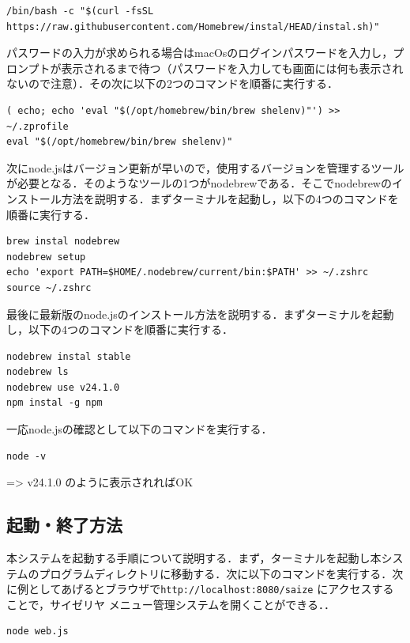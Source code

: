 \documentclass[uplatex,dvipdfmx]{jsarticle}
\begin{document}
\begin{lstlisting}
/bin/bash -c "$(curl -fsSL https://raw.githubusercontent.com/Homebrew/instal/HEAD/instal.sh)"
\end{lstlisting}

パスワードの入力が求められる場合はmacOsのログインパスワードを入力し，プロンプトが表示されるまで待つ（パスワードを入力しても画面には何も表示されないので注意）．その次に以下の2つのコマンドを順番に実行する．

\begin{lstlisting}
( echo; echo 'eval "$(/opt/homebrew/bin/brew shelenv)"') >> ~/.zprofile
eval "$(/opt/homebrew/bin/brew shelenv)"
\end{lstlisting}

次にnode.jsはバージョン更新が早いので，使用するバージョンを管理するツールが必要となる．そのようなツールの1つがnodebrewである．そこでnodebrewのインストール方法を説明する．まずターミナルを起動し，以下の4つのコマンドを順番に実行する．

\begin{lstlisting}
brew instal nodebrew
nodebrew setup
echo 'export PATH=$HOME/.nodebrew/current/bin:$PATH' >> ~/.zshrc
source ~/.zshrc
\end{lstlisting}

最後に最新版のnode.jsのインストール方法を説明する．まずターミナルを起動し，以下の4つのコマンドを順番に実行する．

\begin{lstlisting}
nodebrew instal stable
nodebrew ls
nodebrew use v24.1.0
npm instal -g npm
\end{lstlisting}

一応node.jsの確認として以下のコマンドを実行する．

\begin{lstlisting}
node -v
\end{lstlisting}

=> v24.1.0 のように表示されればOK

\subsection{起動・終了方法}

本システムを起動する手順について説明する．まず，ターミナルを起動し本システムのプログラムディレクトリに移動する．次に以下のコマンドを実行する．次に例としてあげるとブラウザで\texttt{http://localhost:8080/saize} にアクセスすることで，サイゼリヤ メニュー管理システムを開くことができる．．

\begin{lstlisting}
node web.js
\end{lstlisting}
\end{document}
